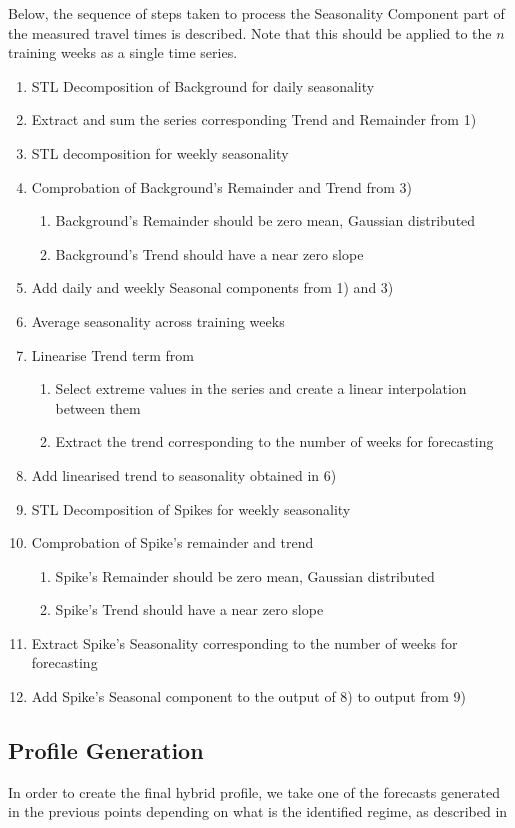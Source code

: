 \documentclass[conference]{IEEEtran}
\begin{document}
Below, the sequence of steps taken to process the Seasonality Component part of the measured travel times is described. 
Note that this should be applied to the $n$ training weeks as a single time series.
\begin{enumerate}
	\item STL Decomposition of Background for daily seasonality
	\item Extract and sum the series corresponding Trend and Remainder from 1)
	\item STL decomposition for weekly seasonality
	\item Comprobation of Background's Remainder and Trend from 3)
	\begin{enumerate}
		\item Background's Remainder should be zero mean, Gaussian distributed
		\item Background's Trend should have a near zero slope
	\end{enumerate}
	\item Add daily and weekly Seasonal components from 1) and 3)
	\item Average seasonality across training weeks
	\item Linearise Trend term from
	\begin{enumerate}
		\item Select extreme values in the series and create a linear interpolation between them
		\item Extract the trend corresponding to the number of weeks for forecasting
	\end{enumerate}
	\item Add linearised trend to seasonality obtained in 6)
	\item STL Decomposition of Spikes for weekly seasonality
	\item Comprobation of Spike's remainder and trend
	\begin{enumerate}
		\item Spike's Remainder should be zero mean, Gaussian distributed
		\item Spike's Trend should have a near zero slope
	\end{enumerate}
	\item Extract Spike's Seasonality corresponding to the number of weeks for forecasting
	\item Add Spike's Seasonal component to the output of 8) to output from 9)
\end{enumerate}
\subsection{Profile Generation}
In order to create the final hybrid profile, we take one of the forecasts generated in the previous points depending on what is the identified regime, as described in 
\end{document}
